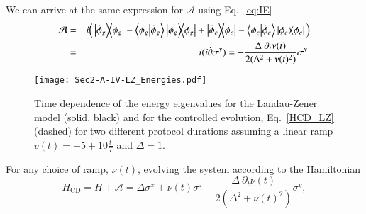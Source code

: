 We can arrive at the same expression for $\mathcal{A}$ using Eq.~\eqref{eq:IE}
\begin{eqnarray}
\mathcal{A} & = & i \Big( \ketbra{\dot{\phi}_g}{\phi_g} - \braket{\phi_g}{\dot{\phi}_g}\ketbra{\phi_g}{\phi_g} + \ketbra{\dot{\phi}_e}{\phi_e} - \braket{\phi_e}{\dot{\phi}_e}\ketbra{\phi_e}{\phi_e}\Big) \nonumber \\
& = & i(i \dot{\theta} \sigma^y) =- \frac{\Delta~\partial_t \nu(t)}{2(\Delta^2+\nu(t)^2)} \sigma^y.
\end{eqnarray}


\begin{figure}[t]
\texttt{[image: Sec2-A-IV-LZ\_Energies.pdf]}
\caption{Time dependence of the energy eigenvalues for the Landau-Zener model (solid, black) and for the controlled evolution, Eq.~\eqref{HCD_LZ} (dashed) for two different protocol durations assuming a linear ramp $v(t)=-5+10\tfrac{t}{T}$ and $\Delta\!=\!1$.}
\label{EnergiesHCD}
\end{figure}
For any choice of ramp, $\nu(t)$, evolving the system according to the Hamiltonian
\begin{equation}
\label{HCD_LZ}
H_\text{CD} = H + \mathcal{A} = \Delta \sigma^x + \nu(t)\sigma^z - \frac{\Delta~\partial_t \nu(t)}{2(\Delta^2 + \nu(t)^2)}\sigma^y,
\end{equation}
